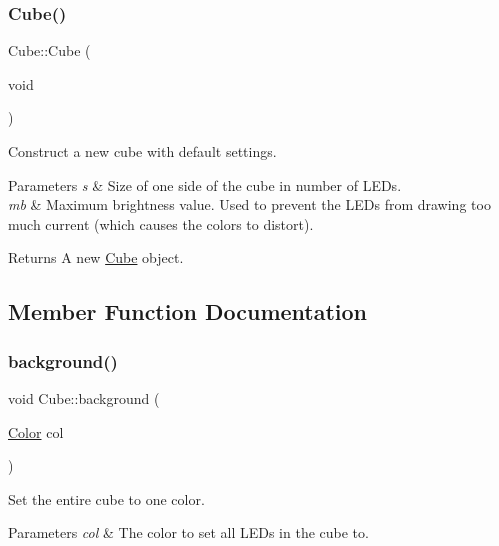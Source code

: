 \subsubsection{\texorpdfstring{Cube()}{Cube()}\hspace{0.1cm}{\footnotesize\ttfamily [2/2]}}
{\footnotesize\ttfamily Cube\+::\+Cube (\begin{DoxyParamCaption}\item[{void}]{ }\end{DoxyParamCaption})}



Construct a new cube with default settings. 


\begin{DoxyParams}{Parameters}
{\em s} & Size of one side of the cube in number of L\+E\+Ds. \\
\hline
{\em mb} & Maximum brightness value. Used to prevent the L\+E\+Ds from drawing too much current (which causes the colors to distort).\\
\hline
\end{DoxyParams}
\begin{DoxyReturn}{Returns}
A new \mbox{\hyperlink{classCube}{Cube}} object. 
\end{DoxyReturn}


\subsection{Member Function Documentation}
\mbox{\label{classCube_af2bb71def4d2a272c794efbfab1ab586}} 
\subsubsection{\texorpdfstring{background()}{background()}}
{\footnotesize\ttfamily void Cube\+::background (\begin{DoxyParamCaption}\item[{\mbox{\hyperlink{structColor}{Color}}}]{col }\end{DoxyParamCaption})}



Set the entire cube to one color. 


\begin{DoxyParams}{Parameters}
{\em col} & The color to set all L\+E\+Ds in the cube to. \\
\hline
\end{DoxyParams}
\mbox{\label{classCube_a2089481fa538bf1514acf8d8ac0bc500}} 
